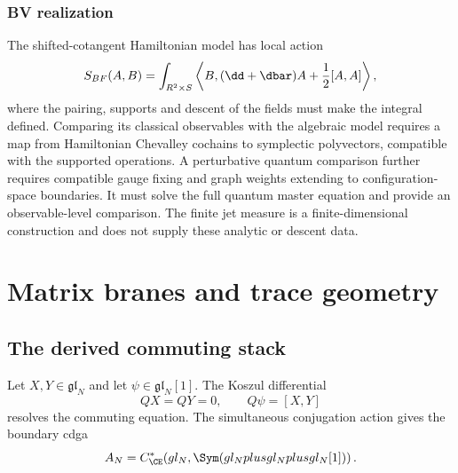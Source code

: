 \section{BV realization}
The shifted-cotangent Hamiltonian model has local action
\[
 S_{\mathrm{BF}}(A,B)
 =\int_{\R^2\times S}
 \left\langle B,(\dd+\dbar)A+\frac12[A,A]\right\rangle,
\]
where the pairing, supports and descent of the fields must make the
integral defined. Comparing its classical observables with the
algebraic model requires a map from Hamiltonian Chevalley cochains
to symplectic polyvectors, compatible with the supported operations.
A perturbative quantum comparison further requires compatible gauge
fixing and graph weights extending to configuration-space boundaries.
It must solve the full quantum master equation and provide an
observable-level comparison. The finite jet measure is a finite-dimensional
construction and does not supply these analytic or descent data.

\part{Matrix branes and trace geometry}

\chapter{The derived commuting stack}
Let $X,Y\in\mathfrak{gl}_N$ and let $\psi\in\mathfrak{gl}_N[1]$.  The Koszul differential
\[
 QX=QY=0,
 \qquad
 Q\psi=[X,Y]
\]
resolves the commuting equation.  The simultaneous conjugation action gives the boundary cdga
\[
 A_N=C^*_{\CE}\!\left(
 \mathfrak{gl}_N,
 \Sym(\mathfrak{gl}_N\oplus\mathfrak{gl}_N\oplus\mathfrak{gl}_N[1])
 \right).
\]

